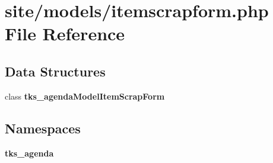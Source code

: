 \section{site/models/itemscrapform.php File Reference}
\label{models_2itemscrapform_8php}
\subsection*{Data Structures}
\begin{DoxyCompactItemize}
\item 
class \textbf{ tks\+\_\+agenda\+Model\+Item\+Scrap\+Form}
\end{DoxyCompactItemize}
\subsection*{Namespaces}
\begin{DoxyCompactItemize}
\item 
 \textbf{ tks\+\_\+agenda}
\end{DoxyCompactItemize}
